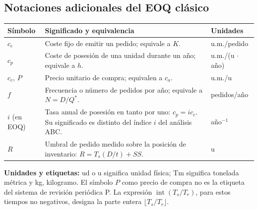 \documentclass[11pt,a4paper]{article}
\begin{document}
\subsection{Notaciones adicionales del EOQ clásico}
\begin{longtable}{@{}p{2cm}p{8cm}p{3.5cm}@{}}
    \toprule
    Símbolo      & Significado y equivalencia                                                                                        & Unidades             \\
    \midrule
    \endhead
    $c_e$        & Coste fijo de emitir un pedido; equivale a $K$.                                                                   & u.m./pedido          \\
    $c_p$        & Coste de posesión de una unidad durante un año; equivale a $h$.                                                   & u.m./(u $\cdot$ año) \\
    $c_c$, $P$   & Precio unitario de compra; equivalen a $c_a$.                                                                     & u.m./u               \\
    $f$          & Frecuencia o número de pedidos por año; equivale a $N=D/Q^{*}$.                                                   & pedidos/año          \\
    $i$ (en EOQ) & Tasa anual de posesión en tanto por uno: $c_p=i c_c$. Su significado es distinto del índice $i$ del análisis ABC. & año$^{-1}$           \\
    $R$          & Umbral de pedido medido sobre la posición de inventario: $R=T_s(D/t)+SS$.                                         & u                    \\
    \bottomrule
\end{longtable}
\textbf{Unidades y etiquetas:} ud o u significa unidad física; Tm significa tonelada métrica y kg, kilogramo. El símbolo $P$ como precio de compra no es la etiqueta del sistema de revisión periódica P. La expresión $\operatorname{int}(T_s/T_r)$, para estos tiempos no negativos, designa la parte entera $\lfloor T_s/T_r\rfloor$.
\end{document}
